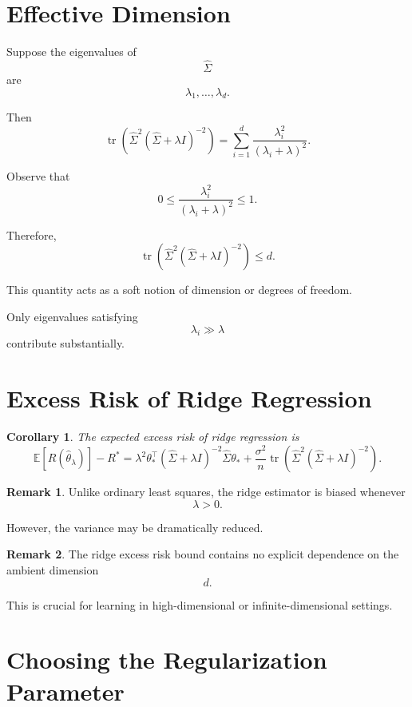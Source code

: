 \documentclass[12pt,oneside]{book}
\numberwithin{equation}{section}
\theoremstyle{definition}
\newtheorem{remark}{Remark}[section]
\theoremstyle{plain}
\newtheorem{corollary}{Corollary}[section]
\theoremstyle{remark}
\newcommand{\E}{\mathbb{E}}
\newcommand{\tr}{\operatorname{tr}}
\begin{document}
\section{Effective Dimension}

Suppose the eigenvalues of
\[
\widehat{\Sigma}
\]
are
\[
\lambda_1,\dots,\lambda_d.
\]

Then
\[
\tr\left(
\widehat{\Sigma}^2
(\widehat{\Sigma}+\lambda I)^{-2}
\right)
=
\sum_{i=1}^d
\frac{\lambda_i^2}{(\lambda_i+\lambda)^2}.
\]

Observe that
\[
0
\leq
\frac{\lambda_i^2}{(\lambda_i+\lambda)^2}
\leq1.
\]

Therefore,
\[
\tr\left(
\widehat{\Sigma}^2
(\widehat{\Sigma}+\lambda I)^{-2}
\right)
\leq d.
\]

This quantity acts as a soft notion of dimension or degrees of freedom.

Only eigenvalues satisfying
\[
\lambda_i\gg\lambda
\]
contribute substantially.

\section{Excess Risk of Ridge Regression}

\begin{corollary}
The expected excess risk of ridge regression is
\[
\E[R(\widehat{\theta}_\lambda)]-R^*
=
\lambda^2
\theta_*^\top
(\widehat{\Sigma}+\lambda I)^{-2}
\widehat{\Sigma}
\theta_*
+
\frac{\sigma^2}{n}
\tr\left(
\widehat{\Sigma}^2
(\widehat{\Sigma}+\lambda I)^{-2}
\right).
\]
\end{corollary}

\begin{remark}
Unlike ordinary least squares, the ridge estimator is biased whenever
\[
\lambda>0.
\]

However, the variance may be dramatically reduced.
\end{remark}

\begin{remark}
The ridge excess risk bound contains no explicit dependence on the ambient dimension
\[
d.
\]

This is crucial for learning in high-dimensional or infinite-dimensional settings.
\end{remark}

\section{Choosing the Regularization Parameter}
\end{document}

